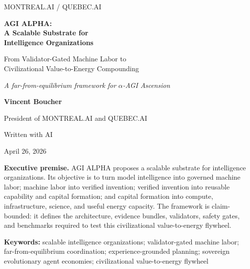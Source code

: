 \documentclass[11pt]{article}
\begin{document}
\begin{titlepage}
\thispagestyle{empty}
\pagecolor{AgiMist}
\vspace*{0.62cm}
\begin{center}
\begin{tcolorbox}[enhanced,width=0.84\textwidth,colback=white,colframe=AgiLine,boxrule=0.55pt,arc=3pt,left=8pt,right=8pt,top=8pt,bottom=8pt]
\centering\Large\textsc{MONTREAL.AI / QUEBEC.AI}
\end{tcolorbox}
\vspace{0.82cm}
\begin{tcolorbox}[enhanced,width=0.94\textwidth,colback=white,colframe=AgiBlue!48,boxrule=0.65pt,arc=4pt,left=14pt,right=14pt,top=14pt,bottom=14pt]
\centering
{\fontsize{28}{33}\selectfont\bfseries\color{AgiBlue} AGI ALPHA:\\[0.18em] A Scalable Substrate for\\[0.18em] Intelligence Organizations\par}
\vspace{0.42cm}
{\Large From Validator-Gated Machine Labor to\\[0.12em] Civilizational Value-to-Energy Compounding\par}
\vspace{0.34cm}
{\normalsize\itshape A far-from-equilibrium framework for $\alpha$-AGI Ascension\par}
\end{tcolorbox}
\vspace{0.68cm}
{\Large\bfseries Vincent Boucher\par}
\vspace{0.12cm}
{\normalsize President of MONTREAL.AI and QUEBEC.AI\par}
{\normalsize Written with AI\par}
\vspace{0.12cm}
{\normalsize April 26, 2026\par}
\vspace{0.58cm}
\begin{executivebox}
\textbf{Executive premise.} AGI ALPHA proposes a scalable substrate for intelligence organizations. Its objective is to turn model intelligence into governed machine labor; machine labor into verified invention; verified invention into reusable capability and capital formation; and capital formation into compute, infrastructure, science, and useful energy capacity. The framework is claim-bounded: it defines the architecture, evidence bundles, validators, safety gates, and benchmarks required to test this civilizational value-to-energy flywheel.
\end{executivebox}
\vfill
\begin{goldbox}
\centering\small\textbf{Keywords:} scalable intelligence organizations; validator-gated machine labor; far-from-equilibrium coordination; experience-grounded planning; sovereign evolutionary agent economies; civilizational value-to-energy flywheel
\end{goldbox}
\end{center}
\end{titlepage}
\end{document}
